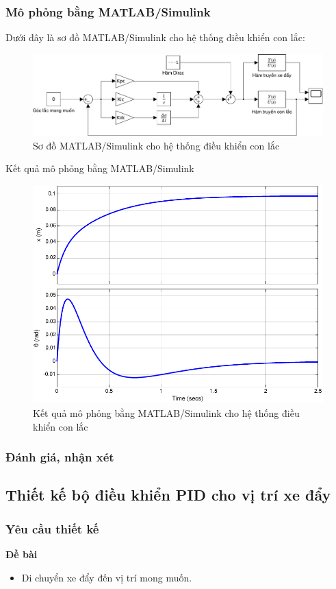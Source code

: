 \documentclass[12pt,a4paper]{article}
\begin{document}
\subsubsection{Mô phỏng bằng MATLAB/Simulink}

Dưới đây là sơ đồ MATLAB/Simulink cho hệ thống điều khiển con lắc: 
\begin{figure}[ht]
    \centering
    \includegraphics[width=\linewidth]{MATLAB_4.pdf}
    \caption{Sơ đồ MATLAB/Simulink cho hệ thống điều khiển con lắc}
\end{figure}

Kết quả mô phỏng bằng MATLAB/Simulink
\begin{figure}[ht]
    \centering
    \includegraphics[width=0.645\linewidth]{MATLAB_5.pdf}
    \caption{Kết quả mô phỏng bằng MATLAB/Simulink cho hệ thống điều khiển con lắc}
\end{figure}

\subsubsection{Đánh giá, nhận xét}


\subsection{Thiết kế bộ điều khiển PID cho vị trí xe đẩy}
\subsubsection{Yêu cầu thiết kế}
\begin{minipage}[t]{0.3\linewidth}
    \textbf{Đề bài}
\end{minipage}\begin{minipage}[t]{0.6\linewidth}
    \begin{itemize}
        \item  Di chuyển xe đẩy đến vị trí mong muốn.
    \end{itemize}
\end{minipage}
\end{document}
